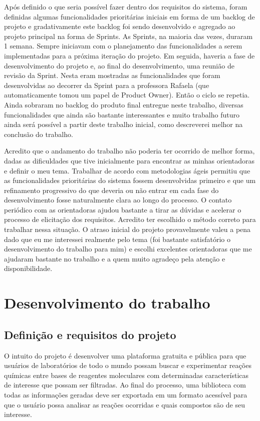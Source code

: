 \documentclass{abnt}
\begin{document}
Após definido o que seria possível fazer dentro dos requisitos do sistema, foram
definidas algumas funcionalidades prioritárias iniciais em forma de um backlog de
projeto e gradativamente este backlog foi sendo desenvolvido e agregado ao projeto
principal na forma de Sprints. As Sprints, na maioria das vezes, duraram 1 semana.
Sempre iniciavam com o planejamento das funcionalidades a serem implementadas para
a próxima iteração do projeto. Em seguida, haveria a fase de desenvolvimento do
projeto e, ao final do desenvolvimento, uma reunião de revisão da Sprint. Nesta
eram mostradas as funcionalidades que foram desenvolvidas ao decorrer da Sprint
para a professora Rafaela (que automaticamente tomou um papel de Product Owner).
Então o ciclo se repetia. Ainda sobraram no backlog do produto final entregue neste
trabalho, diversas funcionalidades que ainda são bastante interessantes e muito
trabalho futuro ainda será possível a partir deste trabalho inicial, como descreverei
melhor na conclusão do trabalho.

Acredito que o andamento do trabalho não poderia ter ocorrido de melhor forma, dadas
as dificuldades que tive inicialmente para encontrar as minhas orientadoras e definir
o meu tema. Trabalhar de acordo com metodologias ágeis permitiu que as funcionalidades
prioritárias do sistema fossem desenvolvidas primeiro e que um refinamento progressivo
do que deveria ou não entrar em cada fase do desenvolvimento fosse naturalmente clara
ao longo do processo. O contato periódico com as orientadoras ajudou bastante a
tirar as dúvidas e acelerar o processo de elicitação dos requisitos. Acredito ter
escolhido o método correto para trabalhar nessa situação. O atraso inicial do projeto
provavelmente valeu a pena dado que eu me interessei realmente pelo tema (foi bastante
satisfatório o desenvolvimento do trabalho para mim) e escolhi excelentes orientadoras
que me ajudaram bastante no trabalho e a quem muito agradeço pela atenção e disponibilidade.

\chapter{Desenvolvimento do trabalho}

\section{Definição e requisitos do projeto}

O intuito do projeto é desenvolver uma plataforma gratuita e pública para que usuários
de laboratórios de todo o mundo possam buscar e experimentar reações químicas entre
bases de reagentes moleculares com determinadas características de interesse que
possam ser filtradas. Ao final do processo, uma biblioteca com todas as informações
geradas deve ser exportada em um formato acessível para que o usuário possa analisar
as reações ocorridas e quais compostos são de seu interesse.
\end{document}
